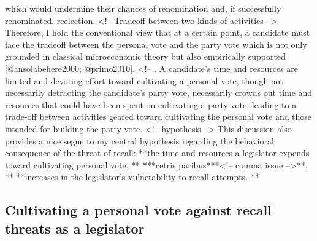 \documentclass[hyphens, crop=false]{standalone}
\begin{document}
		 which would undermine their chances of renomination and,
		 if successfully renominated,
		 reelection.
		 <!-- Tradeoff between two kinds of activities --> Therefore,
		 I hold the conventional view that at a certain point,
		 a candidate must face the tradeoff between the personal vote and the party vote which is not only grounded in classical microeconomic theory but also empirically supported [@ansolabehere2000; @primo2010].
		 <!-- .
		 A candidate's time and resources are limited and devoting effort toward cultivating a personal vote,
		 though not necessarily detracting the candidate's party vote,
		 necessarily crowds out time and resources that could have been spent on cultivating a party vote,
		 leading to a trade-off between activities geared toward cultivating the personal vote and those intended for building the party vote.
		 <!-- hypothesis --> This discussion also provides a nice segue to my central hypothesis regarding the behavioral consequence of the threat of recall: **the time and resources a legislator expends toward cultivating personal vote,
		** ***cetris paribus***<!-- comma issue -->**,
		** **increases in the legislator's vulnerability to recall attempts.
		**
	
		\subsection*{Cultivating a personal vote against recall threats as a legislator}
	
	
\end{document}
